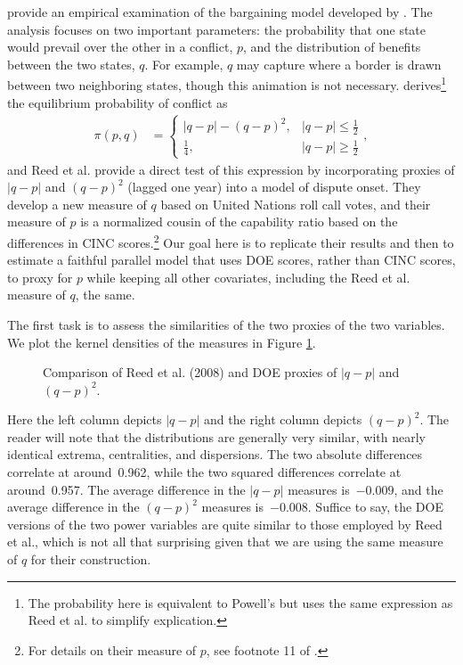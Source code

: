 \citet{reed2008war} provide an empirical examination of the bargaining model developed by \citet{powell1996stability,powell1999}.
The analysis focuses on two important parameters:  the probability that one state would prevail over the other in a conflict, $p$, and the distribution of benefits between the two states, $q$.
For example, $q$ may capture where a border is drawn between two neighboring states, though this animation is not necessary.
\citet[258]{powell1996stability} derives\footnote{%
  The probability here is equivalent to Powell's but uses the same expression as Reed et al. to simplify explication.
}
the equilibrium probability of conflict as
\begin{align*}
  \pi(p, q) &= \begin{cases}
  |q - p| - (q - p)^2, & |q - p| \leq \frac{1}{2} \\
  \frac{1}{4}, & |q - p| \geq \frac{1}{2}
  \end{cases},
\end{align*}
and Reed et al. provide a direct test of this expression by incorporating proxies of $|q - p|$ and $(q - p)^2$ (lagged one year) into a model of dispute onset.
They develop a new measure of $q$ based on United Nations roll call votes, and their measure of $p$ is a normalized cousin of the capability ratio based on the differences in CINC scores.\footnote{%
  For details on their measure of $p$, see footnote 11 of \citet[1211]{reed2008war}.
}
Our goal here is to replicate their results and then to estimate a faithful parallel model that uses DOE scores, rather than CINC scores, to proxy for $p$ while keeping all other covariates, including the Reed et al. measure of $q$, the same.

The first task is to assess the similarities of the two proxies of the two variables.
We plot the kernel densities of the measures in Figure \ref{fig:rcnw-measures}.
\begin{figure}[!ht]
  \centering
  
  \caption{Comparison of Reed et al. (2008) and DOE proxies of $|q - p|$ and $(q - p)^2$.}
  \label{fig:rcnw-measures}
\end{figure}
Here the left column depicts $|q - p|$ and the right column depicts $(q - p)^2$.
The reader will note that the distributions are generally very similar, with nearly identical extrema, centralities, and dispersions.
The two absolute differences correlate at around~0.962, while the two squared differences correlate at around~0.957.
The average difference in the $|q - p|$ measures is~$-0.009$, and the average difference in the $(q-p)^2$ measures is~$-0.008$.
Suffice to say, the DOE versions of the two power variables are quite similar to those employed by Reed et al., which is not all that surprising given that we are using the same measure of $q$ for their construction.

